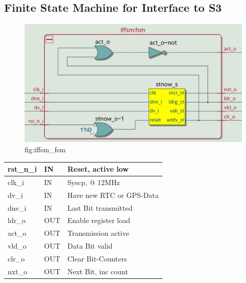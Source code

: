 \documentclass[12pt,a4 paper] {report}
\begin{document}
\subsection{Finite State Machine for Interface to S3}
\begin{figure}[h]
	\centering	
	\includegraphics[scale=0.2]{../png/iffsm_fsm.png}
	\newline
	fig:iffsm\_fsm\\
\end{figure}
\begin{center}
	\begin{tabular}{| p{2cm} | p{2cm} | p{4cm} |}
		\hline
		rst\_n\_i & IN &  Reset, active low\\
		\hline
		clk\_i   & IN  & Syscp, @ 12MHz\\
		\hline
		dv\_i    & IN  &  Have new RTC or GPS-Data\\
		\hline
		dne\_i   & IN  & Last Bit transmitted\\
		\hline
		ldr\_o   & OUT  & Enable register load\\
		\hline
		act\_o   & OUT & Transmission active\\
		\hline
		vld\_o   & OUT &  Data Bit valid\\
		\hline
		clr\_o   & OUT &  Clear Bit-Counters\\
		\hline
		nxt\_o   & OUT &  Next Bit, inc count\\
		\hline
		
	\end{tabular}
	\end{center}
\end{document}
